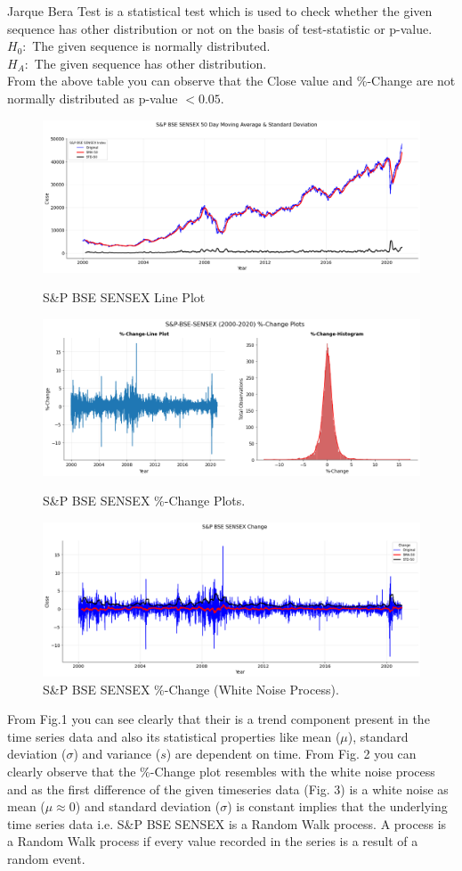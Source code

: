 \documentclass[conference]{IEEEtran}
\begin{document}
Jarque Bera Test is a statistical test which is used to check whether the given sequence has other distribution or not on the basis of test-statistic or p-value. \\
$H_{0}: $ The given sequence is normally distributed.\\
$H_{A}: $ The given sequence has other distribution. \\
From the above table you can observe that the Close value and \%-Change are not normally distributed as p-value $< 0.05$.
\begin{figure}[htbp]
	\centering
	\includegraphics[width = 0.50 \textwidth]{images/SENSEX-Line-Plot.png}
	\caption{S\&P BSE SENSEX Line Plot}
	\includegraphics[width = 0.50 \textwidth]{images/SENSEX 2000-2020 Change Plot.png}
	\caption{S\&P BSE SENSEX \%-Change Plots.}
	\includegraphics[width = 0.50 \textwidth]{images/BSE SENSEX White Noise Part.png}
	\caption{S\&P BSE SENSEX \%-Change (White Noise Process).}
\end{figure}
	
From Fig.1 you can see clearly that their is a  trend component present in the time series data and also its statistical properties like mean ($\mu$), standard deviation ($\sigma$) and variance ($s$) are dependent on time.
From Fig. 2 you can clearly observe that the \%-Change plot resembles with the white noise process and as the first difference of the given timeseries data (Fig. 3) is a white noise as mean ($\mu \approx 0$) and standard deviation ($\sigma$) is constant implies that the underlying time series data i.e. S\&P BSE SENSEX is a Random Walk process.
A process is a Random Walk process if every value recorded in the series is a result of a random event.
	
\end{document}
